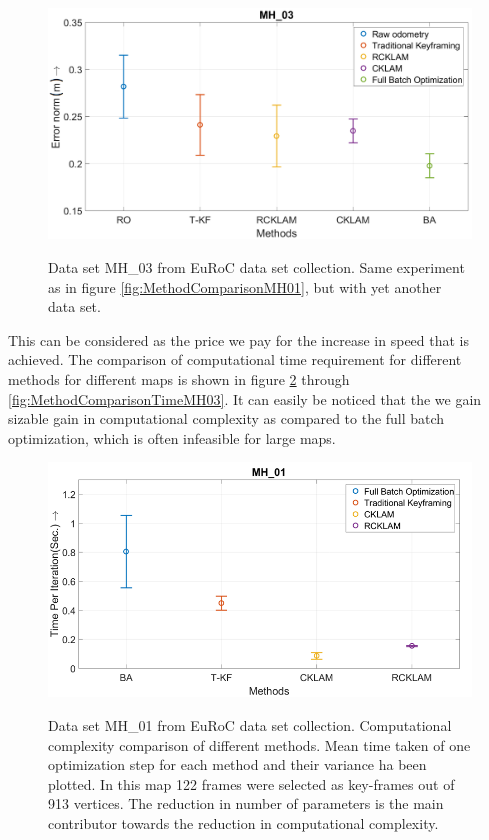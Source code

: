 \begin{figure}
	\centering
		\includegraphics[width=1.00\textwidth]{images/MethodComparisonMH03.png}
	\label{fig:MethodComparisonMH03}
  \caption{Data set MH\_03 from EuRoC \cite{Burri25012016} data set collection. Same experiment as in figure \ref{fig:MethodComparisonMH01}, but with yet another data set.}
\end{figure}

This can be considered as the price we pay for the increase in speed that is achieved. The comparison of computational time requirement for different methods for different maps is shown in figure \ref{fig:MethodComparisonTimeMH01} through \ref{fig:MethodComparisonTimeMH03}. It can easily be noticed that the we gain sizable gain in computational complexity as compared to the full batch optimization, which is often infeasible for large maps. 

\begin{figure}
	\centering
		\includegraphics[width=1.00\textwidth]{images/MethodComparisonTimeMH01.png}
	\label{fig:MethodComparisonTimeMH01}
  \caption{Data set MH\_01 from EuRoC \cite{Burri25012016} data set collection. Computational complexity comparison of different methods. Mean time taken of one optimization step for each method and their variance ha been plotted. In this map 122 frames were selected as key-frames out of 913 vertices. The reduction in number of parameters is the main contributor towards the reduction in computational complexity.}
\end{figure}

